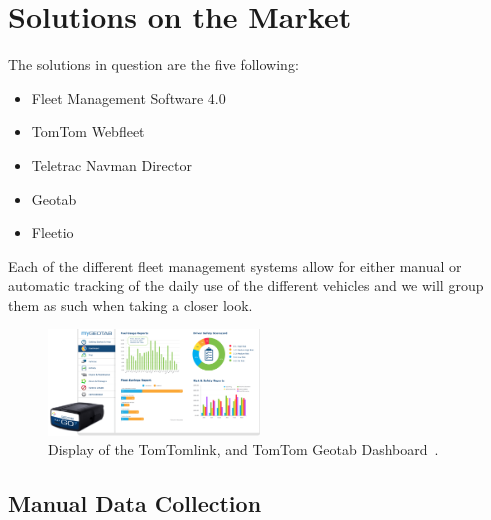 \section{Solutions on the Market}
The solutions in question are the five following:
\begin{itemize}
    \item Fleet Management Software 4.0
    \item TomTom Webfleet
    \item Teletrac Navman Director
    \item Geotab
    \item Fleetio
\end{itemize}
Each of the different fleet management systems allow for either manual or automatic tracking of the daily use of the different vehicles and we will group them as such when taking a closer look.

\begin{figure}[h!]
    \centering
    \includegraphics[width=0.5\textwidth]{img/Geotab_device_dashboard.png}
	\caption{Display of the TomTomlink, and TomTom Geotab Dashboard~\cite{geotab}.}
    \label{fig:TomTom_TomTomlink_GeotabDashboard}
\end{figure}

\subsection{Manual Data Collection}

